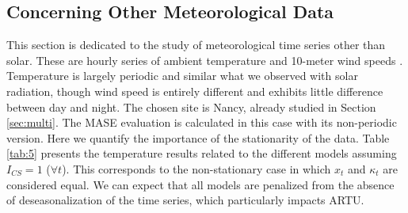 \subsection{Concerning Other Meteorological Data}
\label{sec:other}
This section is dedicated to the study of meteorological time series other than solar. These are hourly series of ambient temperature \citep{CORCHADO1999351} and 10-meter wind speeds \citep{Giebel_2016}. Temperature is largely periodic and similar what we observed with solar radiation, though wind speed is entirely different and exhibits little difference between day and night. The chosen site is Nancy, already studied in Section \ref{sec:multi}. The MASE evaluation is calculated in this case with its non-periodic version. Here we quantify the importance of the stationarity of the data. Table \ref{tab:5} presents the temperature results related to the different models assuming $I_{CS}=1$ ($\forall t$). This corresponds to the non-stationary case in which $x_t$ and $\kappa_t$ are considered equal. We can expect that all models are penalized from the absence of deseasonalization of the time series, which particularly impacts ARTU.


